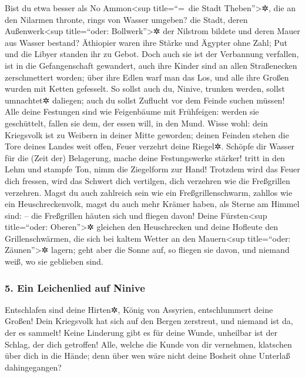  Bist du etwa besser als No Ammon\textless sup
title=``=~die Stadt Theben''\textgreater✲, die an den Nilarmen thronte,
rings von Wasser umgeben? die Stadt, deren Außenwerk\textless sup
title=``oder: Bollwerk''\textgreater✲ der Nilstrom bildete und deren
Mauer aus Wasser bestand?  Äthiopier waren ihre Stärke und
Ägypter ohne Zahl; Put und die Libyer standen ihr zu Gebot.
 Doch auch sie ist der Verbannung verfallen, ist in die
Gefangenschaft gewandert, auch ihre Kinder sind an allen Straßenecken
zerschmettert worden; über ihre Edlen warf man das Los, und alle ihre
Großen wurden mit Ketten gefesselt.  So sollst auch du,
Ninive, trunken werden, sollst umnachtet✲ daliegen; auch du sollst
Zuflucht vor dem Feinde suchen müssen!  Alle deine
Festungen sind wie Feigenbäume mit Frühfeigen: werden sie geschüttelt,
fallen sie dem, der essen will, in den Mund.  Wisse wohl:
dein Kriegsvolk ist zu Weibern in deiner Mitte geworden; deinen Feinden
stehen die Tore deines Landes weit offen, Feuer verzehrt deine Riegel✲.
 Schöpfe dir Wasser für die (Zeit der) Belagerung, mache
deine Festungswerke stärker! tritt in den Lehm und stampfe Ton, nimm die
Ziegelform zur Hand!  Trotzdem wird das Feuer dich
fressen, wird das Schwert dich vertilgen, dich verzehren wie die
Freßgrillen verzehren. Magst du auch zahlreich sein wie ein
Freßgrillenschwarm, zahllos wie ein Heuschreckenvolk, 
magst du auch mehr Krämer haben, als Sterne am Himmel sind: -- die
Freßgrillen häuten sich und fliegen davon!  Deine
Fürsten\textless sup title=``oder: Oberen''\textgreater✲ gleichen den
Heuschrecken und deine Hofleute den Grillenschwärmen, die sich bei
kaltem Wetter an den Mauern\textless sup title=``oder:
Zäunen''\textgreater✲ lagern; geht aber die Sonne auf, so fliegen sie
davon, und niemand weiß, wo sie geblieben sind.

\hypertarget{ein-leichenlied-auf-ninive}{%
\subsubsection{5. Ein Leichenlied auf
Ninive}\label{ein-leichenlied-auf-ninive}}

 Entschlafen sind deine Hirten✲, König von Assyrien,
entschlummert deine Großen! Dein Kriegsvolk hat sich auf den Bergen
zerstreut, und niemand ist da, der es sammelt!  Keine
Linderung gibt es für deine Wunde, unheilbar ist der Schlag, der dich
getroffen! Alle, welche die Kunde von dir vernehmen, klatschen über dich
in die Hände; denn über wen wäre nicht deine Bosheit ohne Unterlaß
dahingegangen?
